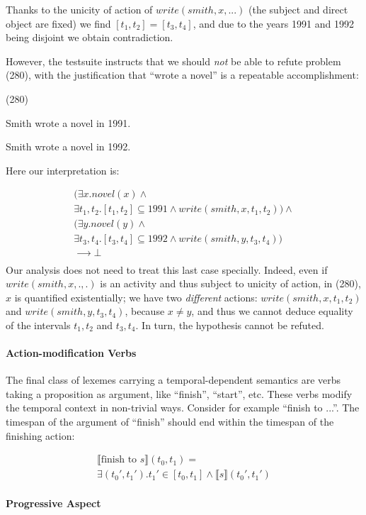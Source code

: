 \documentclass[a4paper,11pt]{article}
\newcommand\hyp{\item[H]}
\newcommand\fracasex[2]{\begin{lingex}\item[(#1)] \begin{subex} #2 \end{subex} \end{lingex} }
\begin{document}
Thanks to the unicity of action of $write(smith,x,...)$ (the subject
and direct object are fixed) we find \([t_1,t_2] = [t_3,t_4]\), and
due to the years 1991 and 1992 being disjoint we obtain contradiction.

However, the testsuite instructs that we should \emph{not} be able to refute
problem (280), with the justification that ``wrote a novel'' is a repeatable
accomplishment:

\fracasex{280}{
\item	Smith wrote a novel in 1991.
\hyp 	Smith wrote a novel in 1992.
}
Here our interpretation is:

\[\begin{array}{l}
(∃x. novel(x) ∧ \\
∃t_1,t_2. [t_1,t_2] ⊆ 1991 ∧ write(smith,x,t_1,t_2)) ∧ \\
(∃y. novel(y) ∧ \\
∃t_3,t_4. [t_3,t_4] ⊆ 1992 ∧ write(smith,y,t_3,t_4)) \\
⟶ ⊥ \\
\end{array}
\]
Our analysis does not need to treat this last case specially. Indeed,
even if $write(smith,x,.,.)$ is an activity and thus subject to
unicity of action, in (280), $x$ is quantified existentially; we have
two \emph{different} actions: $write(smith,x,t_1,t_2)$ and
$write(smith,y,t_3,t_4)$, because $x \neq y$, and thus we cannot
deduce equality of the intervals $t_1,t_2$ and $t_3,t_4$. In turn, the
hypothesis cannot be refuted.

\paragraph{Action-modification Verbs}

The final class of lexemes carrying a temporal-dependent semantics are
verbs taking a proposition as argument, like ``finish'', ``start'',
etc. These verbs modify the temporal context in non-trivial
ways. Consider for example ``finish to ...''. The timespan of the
argument of ``finish'' should end within the timespan of the finishing
action:

\begin{multline*}
⟦\text{finish to \(s\)}⟧(t_0,t_1) = \\ ∃(t_0',t_1'). t_1' ∈ [t_0,t_1] ∧ ⟦s⟧(t_0',t_1')
\end{multline*}

\paragraph{Progressive Aspect}
\end{document}
